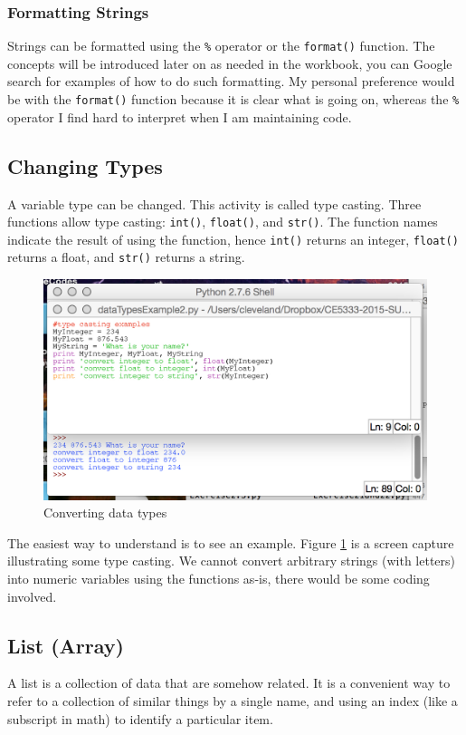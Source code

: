 \subsubsection{Formatting Strings}
Strings can be formatted using the \texttt{\%} operator or the \texttt{format()} function.  The concepts will be introduced later on as needed in the workbook, you can Google search for examples of how to do such formatting.  My personal preference would be with the \texttt{format()} function because it is clear what is going on, whereas the \texttt{\%} operator I find hard to interpret when I am maintaining code.   

\subsection{Changing Types}
A variable type can be changed.  This activity is called type casting.  Three functions allow type casting: \texttt{int()}, \texttt{float()}, and \texttt{str()}.
The function names indicate the result of using the function, hence \texttt{int()} returns an integer, \texttt{float()} returns a float, and \texttt{str()} returns a string.

\begin{figure}[h!] %
   \centering
   \includegraphics[width=5in]{./4-DataTypes/DataTypesExample2.jpg} 
   \caption{Converting data types}
   \label{fig:DataTypesExample2}
\end{figure}
The easiest way to understand is to see an example.  Figure \ref{fig:DataTypesExample2} is a screen capture illustrating some type casting.   We cannot convert arbitrary strings (with letters) into numeric variables using the functions as-is, there would be some coding involved. 
\subsection{List (Array)}
A list is a collection of data that are somehow related.  It is a convenient way to refer to a collection of similar things by a single name, and using an index (like a subscript in math) to identify a particular item.

